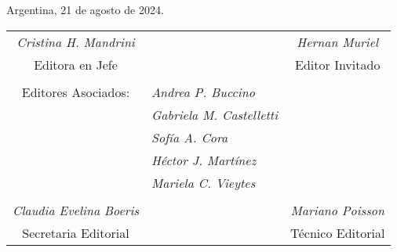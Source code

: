 \documentclass[11pt]{article}
\begin{document}
\vskip 1.2cm
Argentina, 21 de agosto de 2024.

\vskip 1.5cm
\noindent
\begin{center}
\begin{tabular}{cp{5cm}c}
 {\it Cristina H. Mandrini} & & {\it Hernan Muriel}\\
 Editora en Jefe & & Editor Invitado\\
 & &\\
Editores Asociados: & {\it Andrea P. Buccino} & \\
& {\it Gabriela M. Castelletti} & \\
& {\it Sof\'ia A. Cora} & \\
& {\it H\'ector J. Mart\'inez} & \\
& {\it Mariela C. Vieytes} & \\

 & &\\
 
 {\it Claudia Evelina Boeris} & & {\it Mariano Poisson}\\
 Secretaria Editorial & &  T\'ecnico Editorial
\end{tabular}
\end{center}
\end{document}
